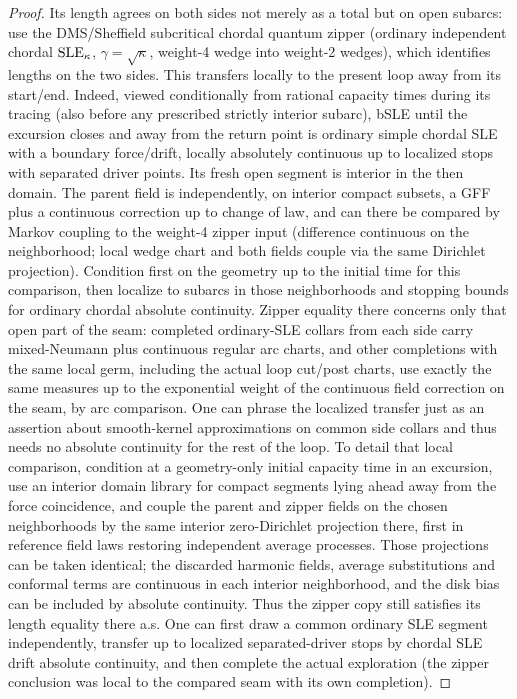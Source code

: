 \begin{proof}
Its length agrees on both sides not merely as a total but on open subarcs: use the DMS/Sheffield subcritical chordal quantum zipper \citep{DMS}\citep[Theorem~1.8 and Remark~5.7]{SheffieldZipper} (ordinary independent chordal \({\rm SLE}_\kappa\), \(\gamma=\sqrt\kappa\), weight-4 wedge into weight-2 wedges), which identifies lengths on the two sides.
This transfers locally to the present loop away from its start/end.
Indeed, viewed conditionally from rational capacity times during its tracing (also before any prescribed strictly interior subarc), bSLE until the excursion closes and away from the return point is ordinary simple chordal SLE with a boundary force/drift, locally absolutely continuous up to localized stops with separated driver points.
Its fresh open segment is interior in the then domain.
The parent field is independently, on interior compact subsets, a GFF plus a continuous correction up to change of law, and can there be compared by Markov coupling to the weight-4 zipper input (difference continuous on the neighborhood; local wedge chart and both fields couple via the same Dirichlet projection).
Condition first on the geometry up to the initial time for this comparison, then localize to subarcs in those neighborhoods and stopping bounds for ordinary chordal absolute continuity.
Zipper equality there concerns only that open part of the seam: completed ordinary-SLE collars from each side carry mixed-Neumann plus continuous regular arc charts, and other completions with the same local germ, including the actual loop cut/post charts, use exactly the same measures up to the exponential weight of the continuous field correction on the seam, by arc comparison.
One can phrase the localized transfer just as an assertion about smooth-kernel approximations on common side collars and thus needs no absolute continuity for the rest of the loop.
To detail that local comparison, condition at a geometry-only initial capacity time in an excursion, use an interior domain library for compact segments lying ahead away from the force coincidence, and couple the parent and zipper fields on the chosen neighborhoods by the same interior zero-Dirichlet projection there, first in reference field laws restoring independent average processes.
Those projections can be taken identical; the discarded harmonic fields, average substitutions and conformal terms are continuous in each interior neighborhood, and the disk bias can be included by absolute continuity.
Thus the zipper copy still satisfies its length equality there a.s.
One can first draw a common ordinary SLE segment independently, transfer up to localized separated-driver stops by chordal SLE drift absolute continuity, and then complete the actual exploration (the zipper conclusion was local to the compared seam with its own completion).

\end{proof}

